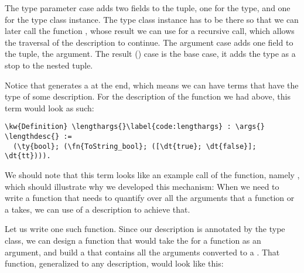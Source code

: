 The type parameter case adds two fields to the tuple, one for the type, and one for the type class instance. The type class instance has to be there so that we can later call the function , whose result we can use for a recursive call, which allows the traversal of the \reified{} description to continue. The argument case adds one field to the tuple, the argument. The result (\RES{}) case is the base case, it adds the  type as a stop to the nested tuple.

Notice that \args{} generates a  at the end, which means we can have terms that have the type \args{} of some description. For the description of the  function we had above, this term would look as such:

\newcommand{\lengthargs}{\hyperref[code:lengthargs]{\fn{length\_\linebreak[0]args\_\linebreak[0]example}}}
\begin{Verbatim}
\kw{Definition} \lengthargs{}\label{code:lengthargs} : \args{} \lengthdesc{} :=
  (\ty{bool}; (\fn{ToString_bool}; ([\dt{true}; \dt{false}]; \dt{tt}))).
\end{Verbatim}

We should note that this term looks like an example call of the  function, namely , which should illustrate why we developed this mechanism: When we need to write a function that needs to quantify over all the arguments that a function or a \constructor{} takes, we can use \args{} of a \reified{} description to achieve that.

Let us write one such function. Since our description \lengthargs{} is annotated by the \ToString{} type class, we can design a function that would take the \args{} for a  function as an argument, and build a  that contains all the arguments converted to a . That function, generalized to any \reified{} description, would look like this:

\newcommand{\appenddescs}{\hyperref[code:appenddescs]{\fn{append\_\linebreak[0]descs}}}

